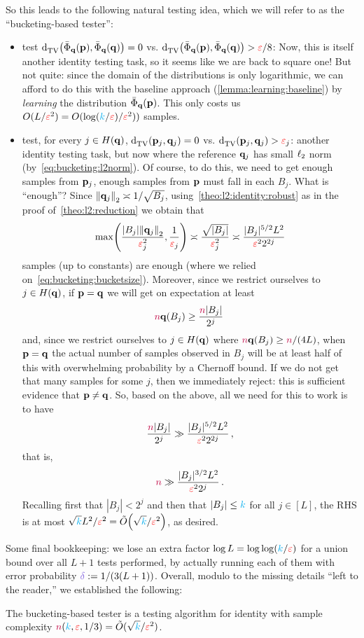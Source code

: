 \noindent So this leads to the following natural testing idea, which we will refer to as the ``bucketing-based tester'':
 \begin{itemize}
 	\item test $\totalvardist{\bar{\Phi}_\q(\p)}{\bar{\Phi}_\q(\q)} = 0$ vs. $\totalvardist{\bar{\Phi}_\q(\p)}{\bar{\Phi}_\q(\q)}>\dst/8$: Now, this is itself another identity testing task, so it seems like we are back to square one! But not quite: since the domain of the distributions is only logarithmic, we can afford to do this with the baseline approach (\cref{lemma:learning:baseline}) by \emph{learning} the distribution $\bar{\Phi}_\q(\p)$. This only costs us $O(L/\dst^2) = O(\log(\ab/\dst)/\dst^2))$ samples.
 	\item test, for every $j\in H(\q)$, $\totalvardist{\p_j}{\q_j} = 0$ vs. $\totalvardist{\p_j}{\q_j}>\dst_j$: another identity testing task, but now where the reference $\q_j$ has small $\lp[2]$ norm (by~\cref{eq:bucketing:l2norm}). Of course, to do this, we need to get enough samples from $\p_j$, \ie enough samples from $\p$ must fall in each $B_j$. What is ``enough''? Since $\normtwo{\q_j}\asymp 1/\sqrt{B_j}$, using~\cref{theo:l2:identity:robust} as in the proof of~\cref{theo:l2:reduction} we obtain that
 	\[
 			\max\Paren{\frac{|B_j|\normtwo{\q_j}}{\dst_j^2}, \frac{1}{\dst_j}} \asymp \frac{\sqrt{|B_j|}}{\dst_j^2} \asymp \frac{|B_j|^{5/2}L^2}{\dst^22^{2j}}
 	\]
 	samples (up to constants) are enough (where we relied on~\cref{eq:bucketing:bucketsize}). Moreover, since we restrict ourselves to $j\in H(\q)$, if $\p=\q$ we will get on expectation at least
 	\[
 		\ns\q(B_j) \geq \frac{\ns|B_j|}{2^j}\;
 	\]
 	and, since we restrict ourselves to $j\in H(\q)$ where $\ns\q(B_j)\geq \ns/(4L)$, when $\p=\q$ the actual number of samples observed in $B_j$ will be at least half of this with overwhelming probability by a Chernoff bound. If we do not get that many samples for some $j$, then we immediately reject: this is sufficient evidence that $\p\neq \q$. So, based on the above, all we need for this to work is to have
 	\[
 		\frac{\ns|B_j|}{2^j} \gg \frac{|B_j|^{5/2}L^2}{\dst^22^{2j}}\,,
 	\]
 	that is,
 	\[
 		\ns \gg \frac{|B_j|^{3/2}L^2}{\dst^22^j}\,.
 	\]
 	Recalling first that $|B_j|<2^j$ and then that $|B_j|\leq \ab$ for all $j\in[L]$, the RHS is at most $\sqrt{\ab}L^2/\dst^2 = \tildeO{\sqrt{\ab}/\dst^2}$, as desired.
 \end{itemize}
Some final bookkeeping: we lose an extra factor $\log L = \log\log(\ab/\dst)$ for a union bound over all $L+1$ tests performed, by actually running each of them with error probability $\errprob \eqdef 1/(3(L+1))$. Overall, modulo to the missing details ``left to the reader,'' we established the following:
\begin{theorem}
  \label{theo:bucketing}
The bucketing-based tester is a testing algorithm for identity with sample complexity $\ns(\ab,\dst,1/3) = \tilde{O}(\sqrt{\ab}/\dst^2)$.
\end{theorem}

